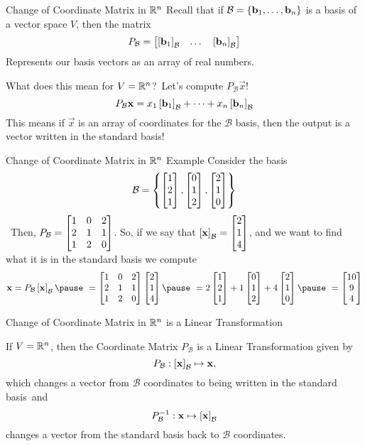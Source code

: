 \documentclass[xcoler=dvipsnames, aspectratio=169]{beamer}
\date{Change of Basis}
\newcommand{\B}{\mathcal{B}}
\begin{document}
    \begin{frame}{Change of Coordinate Matrix in $\mathbb{R}^n$}
        Recall that if $\B=\setBasic{\vec{b}_1,\dots,\vec{b}_n}$ is a basis of a vector space $V$, then
        the matrix
        \[
            P_\B = \bMat{\bCoord{\vec{b}_1}{\B} & \dots & \bCoord{\vec{b}_n}{\B}}
        \]
        Represents our basis vectors as an array of real numbers.\pause\
        
        What does this mean for $V=\mathbb{R}^n$?\pause\ Let's compute $P_\B\vec{x}$!\pause\ 
        \[
            P_\B\vec{x} = x_1\bCoord{\vec{b}_1}{\B} + \dots + x_n\bCoord{\vec{b}_n}{\B}
        \]\pause
        This means if $\vec{x}$ is an array of coordinates for the $\B$ basis, then the output is a
        vector written in the standard basis!
    \end{frame}
    \begin{frame}{Change of Coordinate Matrix in $\mathbb{R}^n$ Example}
        Consider the basis 
        \[
            \B = \setBasic{\bMat{1\\2\\1}, \bMat{0\\1\\2}, \bMat{2\\1\\0}}
        \]\pause\
        Then, $P_\B = \bMat{
            1 & 0 & 2\\
            2 & 1 & 1\\
            1 & 2 & 0
        }$. So, if we say that $\bCoord{\vec{x}}{\B} = \bMat{2\\1\\4}$, and we want to find what
        it is in the standard basis we compute
        \[
            \vec{x} = P_\B\bCoord{\vec{x}}{\B}\pause\ = \bMat{
            1 & 0 & 2\\
            2 & 1 & 1\\
            1 & 2 & 0
        }\bMat{2\\1\\4}\pause\ = 2\bMat{1\\2\\1} + 1\bMat{0\\1\\2} + 4\bMat{2\\1\\0}\pause\ =
        \bMat{10\\9\\4}
        \]
    \end{frame}
    \begin{frame}{Change of Coordinate Matrix in $\mathbb{R}^n$ is a Linear Transformation}
        \begin{theorem}
            If $V=\mathbb{R}^n$, then the Coordinate Matrix $P_\B$ is a Linear Transformation given by
            \[
                P_\B:\bCoord{\vec{x}}{\B}\mapsto\vec{x},
            \]
            which changes a vector from $\B$ coordinates to being written in the standard basis\pause\ 
            and 
            \[
                P^{-1}_\B:\vec{x}\mapsto\bCoord{\vec{x}}{\B}
            \]
            changes a vector from the standard basis back to $\B$ coordinates.
        \end{theorem}
    \end{frame}
\end{document}
